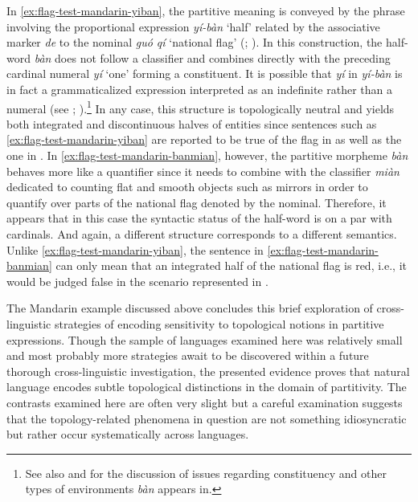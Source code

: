 In \ref{ex:flag-test-mandarin-yiban}, the partitive meaning is conveyed by the phrase involving the proportional expression \textit{y{\'{i}}-b{\`{a}}n} `half' related by the associative marker \textit{de} to the nominal \textit{gu{\'{o}} q{\'{i}}} `national flag' (\citealt[p. 294]{jing-schmidt2005dramatized}; \citealt{jin2018partition}). In this construction, the half-word \textit{b{\`{a}}n} does not follow a classifier and combines directly with the preceding cardinal numeral \textit{y{\'{i}}} `one' forming a constituent. It is possible that \textit{y{\'{i}}} in \textit{y{\'{i}}-b{\`{a}}n} is in fact a grammaticalized expression interpreted as an indefinite rather than a numeral (see \citealt[p. 127]{hsieh2008internal}; \citealt{jin2018partition}).\footnote{See also \citet[p. 46]{hsieh2008internal} and \citet{zhang2011constituency} for the discussion of issues regarding constituency and other types of environments \textit{b{\`{a}}n} appears in.} In any case, this structure is topologically neutral and yields both integrated and discontinuous halves of entities since sentences such as \ref{ex:flag-test-mandarin-yiban} are reported to be true of the flag in  as well as the one in . In \ref{ex:flag-test-mandarin-banmian}, however, the partitive morpheme \textit{b{\`{a}}n} behaves more like a quantifier since it needs to combine with the classifier \textit{mi{\`{a}}n} dedicated to counting flat and smooth objects such as mirrors in order to quantify over parts of the national flag denoted by the nominal. Therefore, it appears that in this case the syntactic status of the half-word is on a par with cardinals. And again, a different structure corresponds to a different semantics. Unlike \ref{ex:flag-test-mandarin-yiban}, the sentence in \ref{ex:flag-test-mandarin-banmian} can only mean that an integrated half of the national flag is red, i.e., it would be judged false in the scenario represented in .

The Mandarin example discussed above concludes this brief exploration of cross-linguistic strategies of encoding sensitivity to topological notions in partitive expressions. Though the sample of languages examined here was relatively small and most probably more strategies await to be discovered within a future thorough cross-linguistic investigation, the presented evidence proves that natural language encodes subtle topological distinctions in the domain of partitivity. The contrasts examined here are often very slight but a careful examination suggests that the topology-related phenomena in question are not something idiosyncratic but rather occur systematically across languages.

